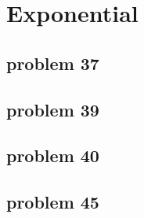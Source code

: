 \section{Exponential}

\subsection{problem 37}

\subsection{problem 39}

\subsection{problem 40}

\subsection{problem 45}

